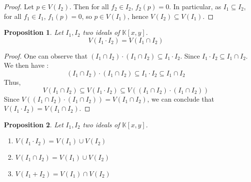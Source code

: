 \documentclass{article}
\newtheorem{proposition}{Proposition}[section]
\begin{document}
\begin{proof}
    Let $p \in V(I_{2})$. Then for all $f_{2} \in I_{2}$, $f_{2}(p) = 0$. In particular, as $I_{1} \subseteq I_{2}$, for all $f_{1} \in I_{1}$, $f_{1}(p) = 0$, so $p \in V(I_{1})$, hence $V(I_{2}) \subseteq V(I_{1})$.
\end{proof}

\begin{proposition}
    Let $I_{1}, I_{2}$ two ideals of $\mathbb{K}[x, y]$. 
    \begin{displaymath}
        V(I_{1} \cdot I_{2}) = V(I_{1} \cap I_{2})
    \end{displaymath}
\end{proposition}

\begin{proof}
    One can observe that $(I_{1} \cap I_{2}) \cdot (I_{1} \cap I_{2}) \subseteq I_{1} \cdot I_{2}$. Since $I_{1} \cdot I_{2} \subseteq I_{1} \cap I_{2}$. We then have : 
    \begin{displaymath}
        (I_{1} \cap I_{2}) \cdot (I_{1} \cap I_{2}) \subseteq I_{1} \cdot I_{2} \subseteq I_{1} \cap I_{2}
    \end{displaymath}
    Thus, 
    \begin{displaymath}
        V(I_{1} \cap I_{2}) \subseteq V(I_{1} \cdot I_{2}) \subseteq V((I_{1} \cap I_{2}) \cdot (I_{1} \cap I_{2}))
    \end{displaymath}
    Since $V((I_{1} \cap I_{2}) \cdot (I_{1} \cap I_{2})) = V(I_{1} \cap I_{2})$, we can conclude that $V(I_{1} \cdot I_{2}) = V(I_{1} \cap I_{2})$.
\end{proof}

\begin{proposition}
    Let $I_{1}, I_{2}$ two ideals of $\mathbb{K}[x, y]$. 
    \begin{enumerate}
        \item[(i)] $V(I_{1} \cdot I_{2}) = V(I_{1}) \cup V(I_{2})$
        \item[(ii)] $V(I_{1} \cap I_{2}) = V(I_{1}) \cup V(I_{2})$
        \item[(iii)] $V(I_{1} + I_{2}) = V(I_{1}) \cap V(I_{2})$
    \end{enumerate}
\end{proposition}
    
\end{document}
